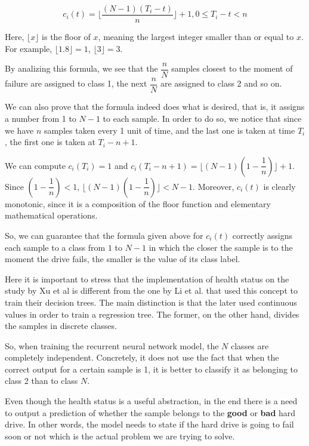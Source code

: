 \begin{equation}\label{eq:linear_discrete_health_status}
c_i(t) = \biggl\lfloor\dfrac{(N-1)(T_i-t)}{n}\biggr\rfloor + 1, 0 \leq T_i - t < n
\end{equation}

Here, $\lfloor x \rfloor$ is the floor of $x$, meaning the largest integer smaller than or equal to $x$.
For example, $\lfloor 1.8 \rfloor = 1$, $\lfloor 3 \rfloor = 3$.

By analizing this formula, we see that the $\dfrac{n}{N}$ samples closest to the moment of failure are assigned to class 1, the next $\dfrac{n}{N}$ are assigned to class 2 and so on.

We can also prove that the formula indeed does what is desired, that is, it assigns a number from 1 to $N-1$ to each sample.
In order to do so, we notice that since we have $n$ samples taken every 1 unit of time, and the last one is taken at time $T_i$, the first one is taken at $T_i - n + 1$.

We can compute $c_i(T_i) = 1$ and $c_i(T_i - n + 1) = \biggl\lfloor(N-1)\left(1-\dfrac{1}{n}\right)\biggr\rfloor + 1$.
Since $\left(1-\dfrac{1}{n}\right) < 1$, $\biggl\lfloor(N-1)\left(1-\dfrac{1}{n}\right)\biggr\rfloor < N - 1$.
Moreover, $c_i(t)$ is clearly monotonic, since it is a composition of the floor function and elementary mathematical operations.

So, we can guarantee that the formula given above for $c_i(t)$ correctly assigns each sample to a class from $1$ to $N-1$ in which the closer the sample is to the moment the drive fails, the smaller is the value of its class label.

Here it is important to stress that the implementation of health status on the study by Xu et al \cite{Xu16} is different from the one by Li et al. that used this concept to train their decision trees.
The main distinction is that the later used continuous values in order to train a regression tree.
The former, on the other hand, divides the samples in discrete classes.

So, when training the recurrent neural network model, the $N$ classes are completely independent.
Concretely, it does not use the fact that when the correct output for a certain sample is 1, it is better to classify it as belonging to class 2 than to class $N$.

Even though the health status is a useful abstraction, in the end there is a need to output a prediction of whether the sample belongs to the \textbf{good} or \textbf{bad} hard drive.
In other words, the model needs to state if the hard drive is going to fail soon or not which is the actual problem we are trying to solve.

